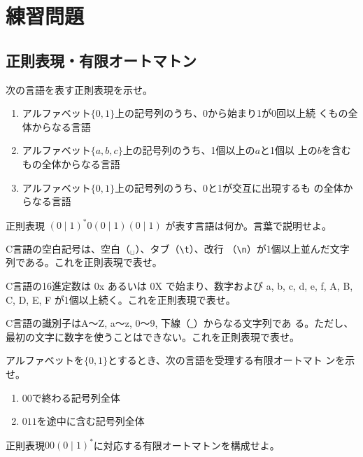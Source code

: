 
\chapter{練習問題}

\section{正則表現・有限オートマトン}

\begin{exercise}
 次の言語を表す正則表現を示せ。
 \begin{enumerate}
  \item アルファベット$\{0, 1\}$上の記号列のうち、0から始まり1が0回以上続
	くもの全体からなる言語
  \item アルファベット$\{a, b, c\}$上の記号列のうち、1個以上の$a$と1個以
	上の$b$を含むもの全体からなる言語
  \item アルファベット$\{0, 1\}$上の記号列のうち、0と1が交互に出現するも
	の全体からなる言語
 \end{enumerate}
\end{exercise}
\begin{exercise}
 正則表現 $(0 \mid 1)^\ast 0(0\mid 1)(0\mid 1)$ が表す言語は何か。言葉で説明せよ。
\end{exercise}
\begin{exercise}
 C言語の空白記号は、空白（$_{\sqcup}$）、タブ（\verb|\t|）、改行
 （\verb|\n|）が1個以上並んだ文字列である。これを正則表現で表せ。
\end{exercise}
\begin{exercise}
 C言語の16進定数は 0x あるいは 0X で始まり、数字および a, b, c, d, e, f,
 A, B, C, D, E, F が1個以上続く。これを正則表現で表せ。
\end{exercise}
\begin{exercise}
 C言語の識別子はA〜Z, a〜z, 0〜9, 下線（\underline{ }）からなる文字列であ
 る。ただし、最初の文字に数字を使うことはできない。これを正則表現で表せ。
\end{exercise}
\begin{exercise}
 アルファベットを$\{0, 1\}$とするとき、次の言語を受理する有限オートマト
 ンを示せ。
 \begin{enumerate}
  \item $00$で終わる記号列全体
  \item $011$を途中に含む記号列全体
 \end{enumerate}
\end{exercise}
\begin{exercise}
 正則表現$00(0 \mid 1)^\ast$に対応する有限オートマトンを構成せよ。
\end{exercise}


